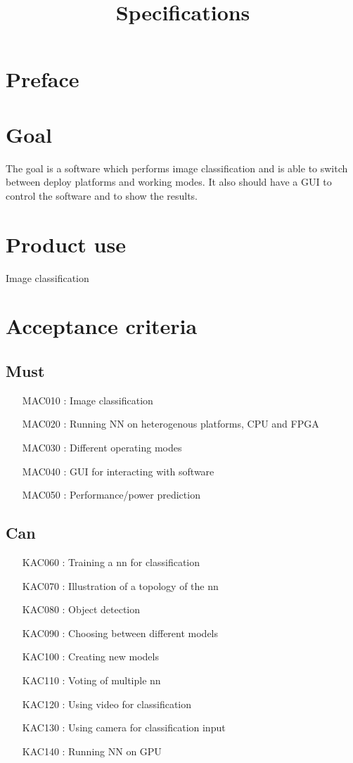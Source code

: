 \documentclass[parskip=full]{scrartcl}
\title{Specifications}
\author{}
\begin{document}
\maketitle

\section{Preface}

\section{Goal}
The goal is a software which performs image classification and is able to switch between deploy platforms and working modes.
It also should have a GUI to control the software and to show the results.

\section{Product use}
Image classification

\section{Acceptance criteria}
\subsection{Must}
\begin{itemize}[nosep]
\item [MAC010]: Image classification
\item [MAC020]: Running NN on heterogenous platforms, CPU and FPGA
\item [MAC030]: Different operating modes
\item [MAC040]: GUI for interacting with software
\item [MAC050]: Performance/power prediction
\end{itemize}

\subsection{Can}
\begin{itemize}[nosep]
\item [KAC060]: Training a nn for classification
\item [KAC070]: Illustration of a topology of the nn
\item [KAC080]: Object detection
\item [KAC090]: Choosing between different models
\item [KAC100]: Creating new models
\item [KAC110]: Voting of multiple nn
\item [KAC120]: Using video for classification
\item [KAC130]: Using camera for classification input
\item [KAC140]: Running NN on GPU
\end{itemize}
\end{document}
